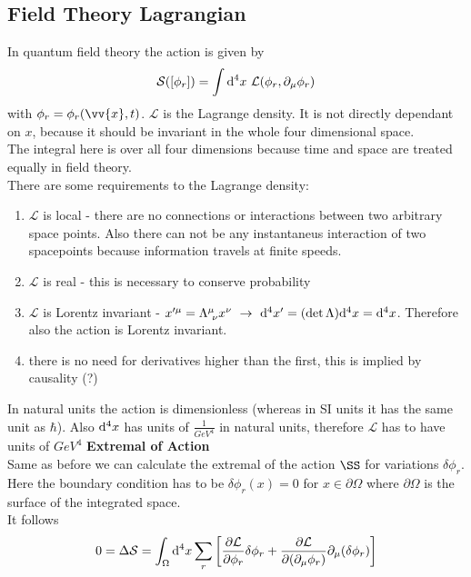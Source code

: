 \documentclass{include/thesisclass}
\newcommand{\LL}{\mathcal{L}}
\newcommand{\SSS}{\mathcal{S}}
\newcommand{\vx}{\vv{x}}
\newcommand{\df}{\rightarrow}
\newcommand{\dd}{{\rm d}}
\newcommand{\p}{\partial}
\begin{document}
\subsection{Field Theory Lagrangian}
In quantum field theory the action is given by
\[ \SSS([\phi_r]) = \int \dd ^4 x~\mathcal{L}(\phi_r, \p_\mu \phi_r)\]
with $\phi_r = \phi_r(\vx, t)$. $\LL$ is the Lagrange density. It is not directly dependant on $x$, because it should be invariant in the whole four dimensional space.\\
The integral here is over all four dimensions because time and space are treated equally in field theory.\\
There are some requirements to the Lagrange density:
\begin{enumerate}
\item $\LL$ is local - there are no connections or interactions between two arbitrary space points. Also there can not be any instantaneus interaction of two spacepoints because information travels at finite speeds.
\item $\LL$ is real - this is necessary to conserve probability
\item $\LL$ is Lorentz invariant - $x'^\mu = \Lambda^\mu_{~\nu}x^\nu ~\df~ \dd^4 x' = (\det \Lambda) \dd^4 x = \dd ^4 x$. Therefore also the action is Lorentz invariant.
\item there is no need for derivatives higher than the first, this is implied by causality (?)
\end{enumerate}
In natural units the action is dimensionless (whereas in SI units it has the same unit as $\hbar$). Also $\dd^4 x$ has units of $\si{\frac{1}{GeV^4}}$ in natural units, therefore $\LL$ has to have units of $\si{GeV}^4$
\newline\newline
\textbf{Extremal of Action}\\
Same as before we can calculate the extremal of the action $\SS$ for variations $\delta \phi_r$. Here the boundary condition has to be $\delta \phi_r(x) = 0$ for $x \in \p \Omega$ where $\p \Omega$ is the surface of the integrated space.\\
It follows
\[ 0 = \Delta \SSS = \int_\Omega \dd ^4 x \sum_r \left[ \frac{\p \LL}{\p \phi_r} \delta \phi_r + \frac{ \p \LL}{\p (\p_\mu \phi_r)} \p_\mu(\delta \phi_r) \right]\]
\end{document}
